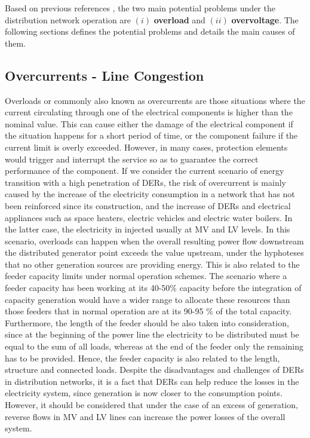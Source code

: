 Based on previous references \cite{ISMAEL20191002, Bollen2011}, the two main potential problems under the distribution network operation are $(i)$ \textbf{overload} and  $(ii)$ \textbf{overvoltage}. The following sections defines the potential problems and details the main causes of them. 


\subsection{Overcurrents - Line Congestion}
Overloads or commonly also known as overcurrents are those situations where the current circulating through one of the electrical components is higher than the nominal value. This can cause either the damage of the electrical component if the situation happens for a short period of time, or the component failure if the current limit is overly exceeded. However, in many cases, protection elements would trigger and interrupt the service so as to guarantee the correct performance of the component. 
If we consider the current scenario of energy transition with a high penetration of DERs, the risk of overcurrent is mainly caused by the increase of the electricity consumption in a network that has not been reinforced since its construction, and the increase of DERs and electrical appliances such as space heaters, electric vehicles and electric water boilers. In the latter case, the electricity in injected usually at MV and LV levels. In this scenario, overloads can happen when the overall resulting power flow downstream the distributed generator point exceeds the value upstream, under the hyphoteses that no other generation sources are providing energy. This is also related to the feeder capacity limits under normal operation schemes. The scenario where a feeder capacity has been working at its 40-50\% capacity before the integration of capacity generation would have a wider range to allocate these resources than those feeders that in normal operation are at its 90-95 \% of the total capacity. Furthermore, the length of the feeder should be also taken into consideration, since at the beginning of the power line the electricity to be distributed must be equal to the sum of all loads, whereas at the end of the feeder only the remaining has to be provided. Hence, the feeder capacity is also related to the length, structure and connected loads. 
Despite the disadvantages and challenges of DERs in distribution networks, it is a fact that DERs can help reduce the losses in the electricity system, since generation is now closer to the consumption points. However, it should be considered that under the case of an excess of generation, reverse flows in MV and LV lines can increase the power losses of the overall system. 

